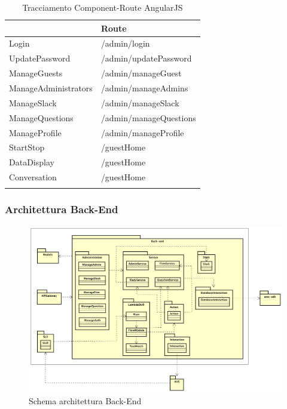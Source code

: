 \documentclass[../DefinizioneDiProdotto.tex]{subfiles}
\begin{document}
			\begin{longtable}[c] { >{\centering\arraybackslash}p{5cm} >{\centering\arraybackslash}p{5cm} }
				\toprule
				{\textbf{Componente}} & {\textbf{Route}} \\
				\midrule
				Login &  /admin/login \\
		 		\addlinespace[0.3em]
				\midrule
				UpdatePassword & /admin/updatePassword   \\
		 		\addlinespace[0.3em]
				\midrule
				ManageGuests &  /admin/manageGuest \\
		 		\addlinespace[0.3em]
				\midrule
				ManageAdministrators &  /admin/manageAdmins \\
		 		\addlinespace[0.3em]
				\midrule
				ManageSlack &  /admin/manageSlack \\
		 		\addlinespace[0.3em]
				\midrule
				ManageQuestions & /admin/manageQuestions  \\
		 		\addlinespace[0.3em]
				\midrule
				ManageProfile &  /admin/manageProfile \\
		 		\addlinespace[0.3em]
				\midrule
				StartStop &  /guestHome \\
		 		\addlinespace[0.3em]
				\midrule
				DataDisplay &  /guestHome \\
		 		\addlinespace[0.3em]
				\midrule
				Conversation &  /guestHome \\
		 		\addlinespace[0.3em]
				\bottomrule
				\caption{Tracciamento Component-Route AngularJS}
			\end{longtable}

		\newpage
		\subsubsection{Architettura Back-End}
		\begin{figure}[!h]
			\centering
			\includegraphics[width=\textwidth]{Architettura/Back-end.png}
			\caption{Schema architettura Back-End}
		\end{figure}
\end{document}
